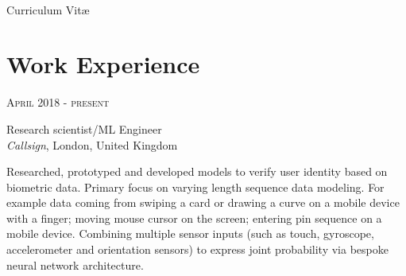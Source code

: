 \documentclass[10pt]{article} %
\begin{document}
\color{text1} %


\par{\\ %
{\color{headings} Curriculum {Vit\ae}\\[15pt]\par} %


\begin{minipage}[t]{0.5\textwidth} %
\vspace{0pt} %


\section{Work Experience}


\vspace{0.5cm}
{\raggedleft\textsc{April 2018 - present}\par}

{\raggedright\large Research scientist/ML Engineer\\
\textit{Callsign}, London, United Kingdom\\[5pt]}

\normalsize{
Researched, prototyped and developed models to verify user 
identity based on biometric data. Primary focus on varying 
length sequence data modeling. For example data coming from 
swiping a card or drawing a curve on a mobile device with 
a finger; moving mouse cursor on the screen; entering pin 
sequence on a mobile device. Combining multiple sensor inputs 
(such as touch, gyroscope, accelerometer and orientation sensors)
to express joint probability via bespoke neural network architecture.
\\

}
\end{minipage}}
\end{document}
